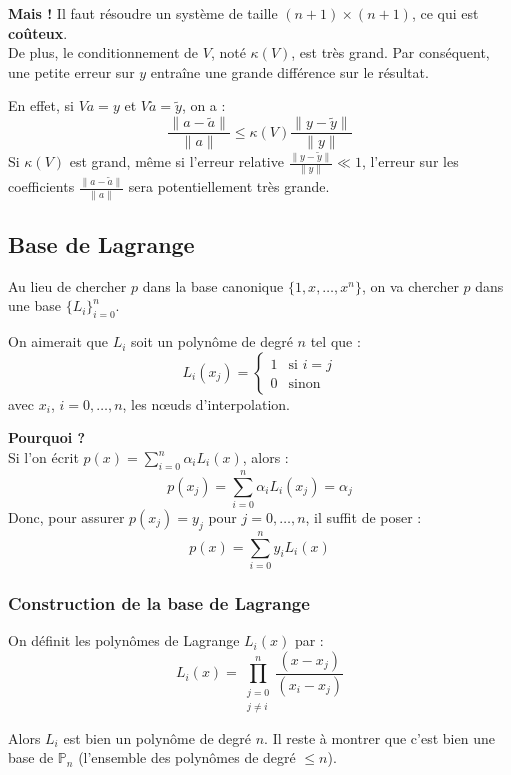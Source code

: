 \begin{remarque}
\textbf{Mais !} Il faut résoudre un système de taille $(n+1) \times (n+1)$, ce qui est \textbf{coûteux}. \\
De plus, le conditionnement de $V$, noté $\kappa(V)$, est très grand. Par conséquent, une petite erreur sur $y$ entraîne une grande différence sur le résultat.

En effet, si $Va = y$ et $V\tilde{a} = \tilde{y}$, on a :
$$\frac{\|a - \tilde{a}\|}{\|a\|} \le \kappa(V) \frac{\|y - \tilde{y}\|}{\|y\|}$$
Si $\kappa(V)$ est grand, même si l'erreur relative $\frac{\|y - \tilde{y}\|}{\|y\|} \ll 1$, l'erreur sur les coefficients $\frac{\|a - \tilde{a}\|}{\|a\|}$ sera potentiellement très grande.
\end{remarque}

\subsection{Base de Lagrange}

Au lieu de chercher $p$ dans la base canonique $\{1, x, \dots, x^n\}$, on va chercher $p$ dans une base $\{L_i\}_{i=0}^n$.

On aimerait que $L_i$ soit un polynôme de degré $n$ tel que :
$$
L_i(x_j) = 
\begin{cases} 
1 & \text{si } i = j \\ 
0 & \text{sinon} 
\end{cases}
$$
avec $x_i$, $i=0,\dots,n$, les nœuds d'interpolation.

\textbf{Pourquoi ?} \\
Si l'on écrit $p(x) = \sum_{i=0}^n \alpha_i L_i(x)$, alors :
$$p(x_j) = \sum_{i=0}^n \alpha_i L_i(x_j) = \alpha_j$$
Donc, pour assurer $p(x_j) = y_j$ pour $j=0,\dots,n$, il suffit de poser :
$$p(x) = \sum_{i=0}^n y_i L_i(x)$$

\subsubsection{Construction de la base de Lagrange}

\begin{definition}
On définit les polynômes de Lagrange $L_i(x)$ par :
$$L_i(x) = \prod_{\substack{j=0 \\ j \neq i}}^n \frac{(x - x_j)}{(x_i - x_j)}$$
\end{definition}

Alors $L_i$ est bien un polynôme de degré $n$.
Il reste à montrer que c'est bien une base de $\mathbb{P}_n$ (l'ensemble des polynômes de degré $\le n$).

